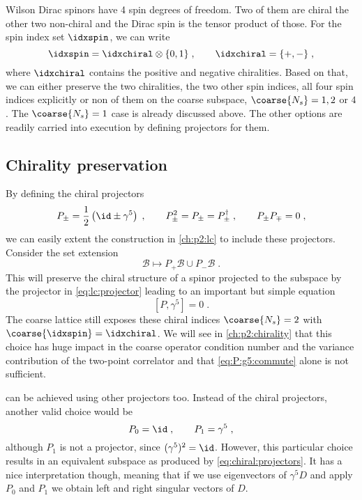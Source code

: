 Wilson Dirac spinors have \num{4} spin degrees of freedom.
Two of them are chiral the other two non-chiral and the Dirac spin is the tensor product of those.
For the spin index set $\idxspin$, we can write
\begin{equation}
\idxspin = \idxchiral \otimes \{0, 1\} \;,
\qquad
\idxchiral = \{ +, - \} \;,
\end{equation}
where $\idxchiral$ contains the positive and negative chiralities.
Based on that, we can either preserve the two chiralities, the two other spin indices, all four spin indices explicitly or non of them on the coarse subspace, $\coarse{N_s} = 1,2$ or $4$.
The $\coarse{N_s} = 1$ case is already discussed above.
The other options are readily carried into execution by defining projectors for them.

\subsection{Chirality preservation}

By defining the chiral projectors
\begin{equation} \label{eq:chiral:projectors}
P_{\pm} = \frac{1}{2} \left( \id \pm \gamma^{5} \right) \;,
\qquad
P_{\pm}^{2} = P_{\pm} = P_{\pm}^{\dagger} \;,
\qquad
P_{\pm} P_{\mp} = 0 \;,
\end{equation}
we can easily extent the construction in \cref{ch:p2:lc} to include these projectors.
Consider the set extension
\begin{equation} \label{eq:bootstrap:chiral}
\mathcal{B} \longmapsto P_{+} \mathcal{B} \cup P_{-} \mathcal{B} \;.
\end{equation}
This will preserve the chiral structure of a spinor projected to the subspace by the projector in \cref{eq:lc:projector} leading to an important but simple equation
\begin{equation} \label{eq:P:g5:commute}
[P, \gamma^{5}] = 0 \;.
\end{equation}
The coarse lattice still exposes these chiral indices $\coarse{N_s} = 2$ with $\coarse{\idxspin} = \idxchiral$.
We will see in \cref{ch:p2:chirality} that this choice has huge impact in the coarse operator condition number and the variance contribution of the two-point correlator and that \cref{eq:P:g5:commute} alone is not sufficient.

 can be achieved using other projectors too.
Instead of the chiral projectors, another valid choice would be
\begin{equation} \label{eq:chiral:projectors:id:g5}
P_0 = \id \;,
\qquad
P_1 = \gamma^{5} \;,
\end{equation}
although $P_1$ is not a projector, since $(\gamma^5)^2 = \id$.
However, this particular choice results in an equivalent subspace as produced by \cref{eq:chiral:projectors}.
It has a nice interpretation though, meaning that if we use eigenvectors of $\gamma^5 D$ and apply $P_0$ and $P_1$ we obtain left and right singular vectors of $D$.

